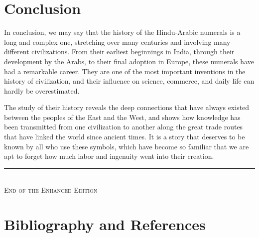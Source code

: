 \documentclass[11pt,a4paper]{article}
\begin{document}
\newpage

\section*{Conclusion}

In conclusion, we may say that the history of the Hindu-Arabic numerals is a long and complex one, stretching over many centuries and involving many different civilizations. From their earliest beginnings in India, through their development by the Arabs, to their final adoption in Europe, these numerals have had a remarkable career. They are one of the most important inventions in the history of civilization, and their influence on science, commerce, and daily life can hardly be overestimated.

The study of their history reveals the deep connections that have always existed between the peoples of the East and the West, and shows how knowledge has been transmitted from one civilization to another along the great trade routes that have linked the world since ancient times. It is a story that deserves to be known by all who use these symbols, which have become so familiar that we are apt to forget how much labor and ingenuity went into their creation.

\vfill
\begin{center}
\rule{0.5\textwidth}{0.4pt}\\[0.5cm]
{\small \textsc{End of the Enhanced Edition}}
\end{center}

\newpage

\section*{Bibliography and References}
\end{document}
